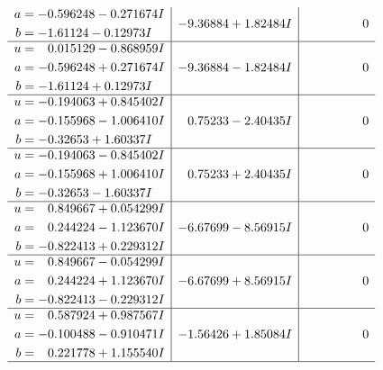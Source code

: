 \documentclass[1p]{elsarticle_modified}
\theoremstyle{definition}
\begin{document}
$$\begin{array}{c|c|c}
\begin{aligned}
a &= -0.596248 - 0.271674 I \\
b &= -1.61124 - 0.12973 I\end{aligned}
 & -9.36884 + 1.82484 I & \phantom{-0.000000 } 0 \\ \hline\begin{aligned}
u &= \phantom{-}0.015129 - 0.868959 I \\
a &= -0.596248 + 0.271674 I \\
b &= -1.61124 + 0.12973 I\end{aligned}
 & -9.36884 - 1.82484 I & \phantom{-0.000000 } 0 \\ \hline\begin{aligned}
u &= -0.194063 + 0.845402 I \\
a &= -0.155968 - 1.006410 I \\
b &= -0.32653 + 1.60337 I\end{aligned}
 & \phantom{-}0.75233 - 2.40435 I & \phantom{-0.000000 } 0 \\ \hline\begin{aligned}
u &= -0.194063 - 0.845402 I \\
a &= -0.155968 + 1.006410 I \\
b &= -0.32653 - 1.60337 I\end{aligned}
 & \phantom{-}0.75233 + 2.40435 I & \phantom{-0.000000 } 0 \\ \hline\begin{aligned}
u &= \phantom{-}0.849667 + 0.054299 I \\
a &= \phantom{-}0.244224 - 1.123670 I \\
b &= -0.822413 + 0.229312 I\end{aligned}
 & -6.67699 - 8.56915 I & \phantom{-0.000000 } 0 \\ \hline\begin{aligned}
u &= \phantom{-}0.849667 - 0.054299 I \\
a &= \phantom{-}0.244224 + 1.123670 I \\
b &= -0.822413 - 0.229312 I\end{aligned}
 & -6.67699 + 8.56915 I & \phantom{-0.000000 } 0 \\ \hline\begin{aligned}
u &= \phantom{-}0.587924 + 0.987567 I \\
a &= -0.100488 - 0.910471 I \\
b &= \phantom{-}0.221778 + 1.155540 I\end{aligned}
 & -1.56426 + 1.85084 I & \phantom{-0.000000 } 0\\
 \hline 
 \end{array}$$\newpage$$\begin{array}{c|c|c}  

\end{array}$$
\end{document}
